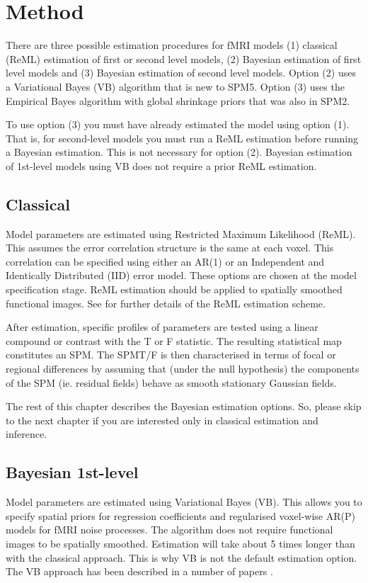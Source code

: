 \documentclass[a4paper,titlepage]{book}
\begin{document}
\section{Method}
There are three possible estimation procedures for fMRI models (1) classical (ReML) estimation of first or second level models, (2) Bayesian estimation of first level models and (3) Bayesian estimation of second level models. Option (2) uses a Variational Bayes (VB) algorithm that is new to SPM5. Option (3) uses the Empirical Bayes algorithm with global shrinkage priors that was also in SPM2. 

                                                                                                            

To use option (3) you must have already estimated the model using option (1). That is, for second-level models you must run a ReML estimation before running a Bayesian estimation. This is not necessary for option (2). Bayesian estimation of 1st-level models using VB does not require a prior ReML estimation.


\subsection{Classical}
Model parameters are estimated using Restricted Maximum Likelihood (ReML). This assumes the error correlation structure is the same at each voxel. This correlation can be specified using either an AR(1) or an Independent and Identically Distributed (IID) error model. These options are chosen at the model specification stage. ReML estimation should be applied to spatially smoothed functional images. See \cite{peb1,peb2} for 
further details of the ReML estimation scheme.

                                                                        After estimation, specific profiles of parameters are tested using a linear compound or contrast with the T or F statistic. The resulting statistical map constitutes an SPM. The SPM{T}/{F} is then characterised in terms of focal or regional differences by assuming that (under the null hypothesis) the components of the SPM (ie. residual fields) behave as smooth stationary Gaussian fields.

The rest of this chapter describes the Bayesian estimation options.
So, please skip to the next chapter if you are interested only in 
classical estimation and inference. 

\subsection{Bayesian 1st-level}
Model parameters are estimated using Variational Bayes (VB). This allows you to specify spatial priors for regression coefficients and regularised voxel-wise AR(P) models for fMRI noise processes. The algorithm does not require functional images to be spatially smoothed. Estimation will take about 5 times longer than with the classical approach. This is why VB is not the default estimation option. The VB approach has been described in a number of papers \cite{vb_fmri_ar,vb2,vb3,vb4}.
                                                          
\end{document}
